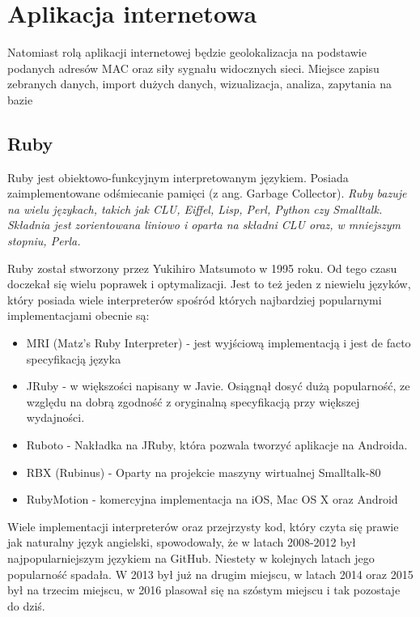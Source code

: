 \section{Aplikacja internetowa}
Natomiast rolą aplikacji internetowej będzie geolokalizacja na podstawie podanych adresów MAC oraz siły sygnału widocznych sieci. Miejsce zapisu zebranych danych, import dużych danych, wizualizacja, analiza, zapytania na bazie

\subsection{Ruby}
Ruby jest obiektowo-funkcyjnym interpretowanym językiem. Posiada zaimplementowane odśmiecanie pamięci (z ang. Garbage Collector). \textit{Ruby bazuje na wielu językach, takich jak CLU, Eiffel, Lisp, Perl, Python czy Smalltalk. Składnia jest zorientowana liniowo i oparta na składni CLU oraz, w mniejszym stopniu, Perla.}\cite{RubyWiki}

Ruby został stworzony przez Yukihiro Matsumoto w 1995 roku. Od tego czasu doczekał się wielu poprawek i optymalizacji. Jest to też jeden z niewielu języków, który posiada wiele interpreterów spośród których najbardziej popularnymi implementacjami obecnie są:
\begin{itemize}
    \item MRI (Matz's Ruby Interpreter) - jest wyjściową implementacją i jest de facto specyfikacją języka
    \item JRuby - w większości napisany w Javie. Osiągnął dosyć dużą popularność, ze względu na dobrą zgodność z oryginalną specyfikacją przy większej wydajności.
    \item Ruboto - Nakładka na JRuby, która pozwala tworzyć aplikacje na Androida.
    \item RBX (Rubinus) - Oparty na projekcie maszyny wirtualnej Smalltalk-80
    \item RubyMotion - komercyjna implementacja na iOS, Mac OS X oraz Android
\end{itemize}

Wiele implementacji interpreterów oraz przejrzysty kod, który czyta się prawie jak naturalny język angielski, spowodowały, że w latach 2008-2012 był najpopularniejszym językiem na GitHub.\cite{RubyStats2015} Niestety w kolejnych latach jego popularność spadała. W 2013 był już na drugim miejscu, w latach 2014 oraz 2015 był na trzecim miejscu\cite{RubyStats2015}, w 2016 plasował się na szóstym miejscu i tak pozostaje do dziś.\cite{GithutStats2017}

